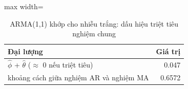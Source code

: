 \begin{table}[H]
\centering\small
\caption{ARMA(1,1) khớp cho nhiễu trắng: dấu hiệu triệt tiêu nghiệm chung}\label{tab:tab_b11_10_cancellation}
\begin{adjustbox}{max width=\linewidth}
\begin{tabular}{>{\raggedright\arraybackslash}p{}r}
\toprule
Đại lượng & Giá trị \\
\midrule
$\hat{\phi}$ + $\hat{\theta}$ ($\approx$ 0 nếu triệt tiêu) & 0.047 \\
khoảng cách giữa nghiệm AR và nghiệm MA & 0.6572 \\
\bottomrule
\end{tabular}
\end{adjustbox}
\end{table}
